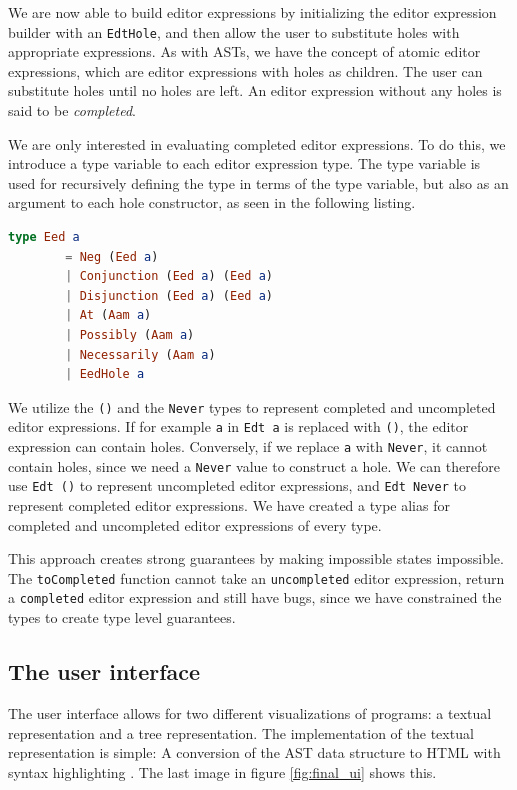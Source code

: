 We are now able to build editor expressions by initializing the editor
expression builder with an \texttt{EdtHole}, and then allow the user to
substitute holes with appropriate expressions. As with ASTs, we have the concept
of atomic editor expressions, which are editor expressions with holes as
children. The user can substitute holes until no holes are left. An editor
expression without any holes is said to be \textit{completed}.

We are only interested in evaluating completed editor expressions. To do this,
we introduce a type variable to each editor expression type. The type variable
is used for recursively defining the type in terms of the type variable, but
also as an argument to each hole constructor, as seen in the following
listing.

\begin{lstlisting}[language=elm,%
                   label="eed-definitions",%
                   gobble=4,%
                   ]
    type Eed a
        = Neg (Eed a)
        | Conjunction (Eed a) (Eed a)
        | Disjunction (Eed a) (Eed a)
        | At (Aam a)
        | Possibly (Aam a)
        | Necessarily (Aam a)
        | EedHole a
\end{lstlisting}

We utilize the \texttt{()} and the \texttt{Never} types to represent
completed and uncompleted editor expressions. If for example \texttt{a} in
\texttt{Edt a} is replaced with \texttt{()}, the editor expression can contain
holes. Conversely, if we replace \texttt{a} with \texttt{Never}, it cannot
contain holes, since we need a \texttt{Never} value to construct a hole. We can
therefore use \texttt{Edt ()} to represent uncompleted editor expressions, and
\texttt{Edt Never} to represent completed editor expressions. We have created a
type alias for completed and uncompleted editor expressions of every type.

This approach creates strong guarantees by making impossible states impossible.
The \texttt{toCompleted} function cannot take an \texttt{uncompleted} editor
expression, return a \texttt{completed} editor expression and still have bugs,
since we have constrained the types to create type level guarantees.

\subsection{The user interface}
\label{user-interface}

The user interface allows for two different visualizations of
programs: a textual representation and a tree representation. The
implementation of the textual representation is simple: A conversion
of the AST data structure to HTML with syntax highlighting . The last
image in figure \ref{fig:final_ui} shows this.

